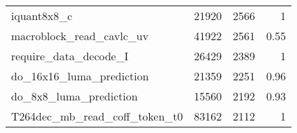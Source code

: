 \begin{longtable}[\textwidth]{lrrr}
    iquant8x8\_c				&	21920	&	2566 	&	1		\\
    macroblock\_read\_cavlc\_uv	
    							&	41922	&	2561 	&	0.55	\\ \rowcolor{gray!15}
    require\_data\_decode\_I	&	26429	&	2389 	&	1		\\
    do\_16x16\_luma\_prediction	
    							&	21359	&	2251 	&	0.96	\\ \rowcolor{gray!15}
    do\_8x8\_luma\_prediction	&	15560	&	2192 	&	0.93	\\
    T264dec\_mb\_read\_coff\_token\_t0	
    							&	83162	&	2112 	&	1		\\
    \bottomrule[1.5pt]
\end{longtable}
